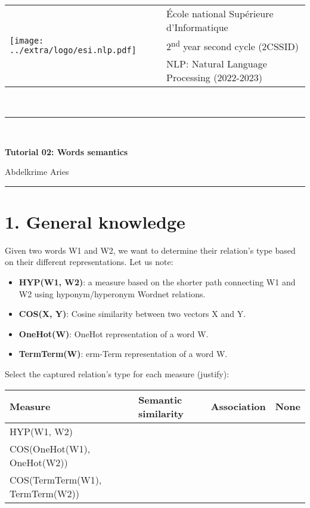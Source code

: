\documentclass[11pt, a4paper]{article}
\begin{document}

\noindent
\begin{tabular}{ll}
\multirow{3}{*}{\texttt{[image: ../extra/logo/esi.nlp.pdf]}} & 
\'Ecole national Supérieure d'Informatique\\
& 2\textsuperscript{nd} year second cycle (2CSSID)\\
& NLP: Natural Language Processing (2022-2023)
\end{tabular}\\[.25cm]
\noindent\rule{\textwidth}{2pt}\\[-0.5cm]
\begin{center}
{\LARGE \textbf{Tutorial 02: Words semantics}}
\begin{flushright}
	Abdelkrime Aries
\end{flushright}
\end{center}\vspace{-0.5cm}
\noindent\rule{\textwidth}{2pt}

\section*{1. General knowledge}

Given two words W1 and W2, we want to determine their relation's type based on their different representations.
Let us note:
\begin{itemize}
	\item \textbf{HYP(W1, W2)}: a measure based on the shorter path connecting W1 and W2 using hyponym/hyperonym Wordnet relations.
	\item \textbf{COS(X, Y)}: Cosine similarity between two vectors X and Y.
	\item \textbf{OneHot(W)}: OneHot representation of a word W.
	\item \textbf{TermTerm(W)}: erm-Term representation of a word W.
\end{itemize}

\noindent
Select the captured relation's type for each measure (justify):
\begin{center}
	\begin{tabular}{|llll|}
	\hline 
	Measure & Semantic similarity & Association & None\\
	\hline
	HYP(W1, W2) & \Square & \Square & \Square \\
	COS(OneHot(W1), OneHot(W2)) & \Square & \Square & \Square \\
	COS(TermTerm(W1), TermTerm(W2)) & \Square & \Square & \Square \\
	\hline
	\end{tabular}
\end{center}
\end{document}
